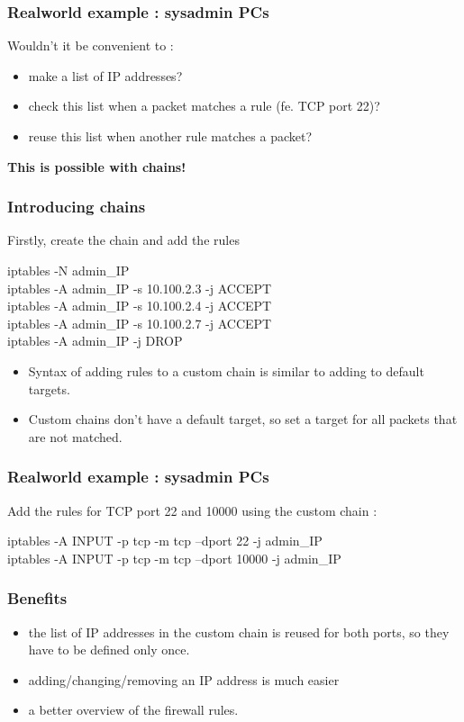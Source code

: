 \documentclass[14pt]{beamer}
\begin{document}
  \begin{frame}
    \frametitle{Realworld example : sysadmin PCs}
    Wouldn't it be convenient to :
    \begin{itemize}
      \item make a list of IP addresses?
      \item check this list when a packet matches a rule (fe. TCP port 22)?
      \item reuse this list when another rule matches a packet?
    \end{itemize}
    \pause
    \textbf{This is possible with chains!}
  \end{frame}
  \begin{frame}
    \frametitle{Introducing chains}
    Firstly, create the chain and add the rules
    \begin{example}
      \small{iptables -N admin\_IP\\
      iptables -A admin\_IP -s 10.100.2.3 -j ACCEPT\\
      iptables -A admin\_IP -s 10.100.2.4 -j ACCEPT\\
      iptables -A admin\_IP -s 10.100.2.7 -j ACCEPT\\
      iptables -A admin\_IP -j DROP}
    \end{example}
    \pause
    \begin{itemize}[<+->]
      \item Syntax of adding rules to a custom chain is similar to adding to default targets.
      \item Custom chains don't have a default target, so set a target for all packets that are not matched.
    \end{itemize}
  \end{frame}
  \begin{frame}
    \frametitle{Realworld example : sysadmin PCs}
    Add the rules for TCP port 22 and 10000 using the custom chain :
    \begin{example}
      \small{iptables -A INPUT -p tcp -m tcp --dport 22 -j admin\_IP\\
      iptables -A INPUT -p tcp -m tcp --dport 10000 -j admin\_IP}
    \end{example}
  \end{frame}
  \begin{frame}
    \frametitle{Benefits}
    \begin{itemize}
      \item the list of IP addresses in the custom chain is reused for both ports, so they have to be defined only once.
      \item adding/changing/removing an IP address is much easier
      \item a better overview of the firewall rules.
    \end{itemize}
  \end{frame}
\end{document}
